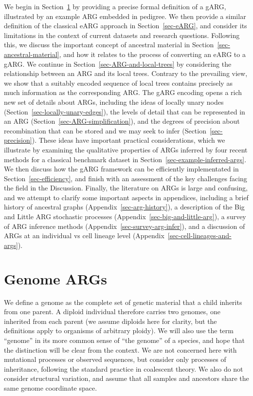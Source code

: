 \documentclass{article}
\begin{document}
We begin in Section~\ref{sec-gARG} by providing a precise formal definition
of a gARG, illustrated by an example ARG embedded in pedigree.
We then provide a similar definition of the classical eARG
approach in Section~\ref{sec-eARG}, and consider its limitations
in the context of current datasets and research questions.
Following this, we discuss the important concept of ancestral material
in Section~\ref{sec-ancestral-material}, and how it relates
to the process of converting an eARG to a gARG.
We continue
in Section~\ref{sec-ARG-and-local-trees} by considering the relationship
between an ARG and its local trees. Contrary to the
prevailing view, we show that a suitably encoded sequence of local trees contains
precisely as much information as the corresponding ARG.
The gARG encoding opens a rich new set of details about ARGs,
including the ideas of locally unary nodes
(Section~\ref{sec-locally-unary-edges}),
the levels of detail that can be represented in an ARG
(Section~\ref{sec-ARG-simplification}),
and the degrees of precision about recombination
that can be stored and we may seek to infer (Section~\ref{sec-precision}).
These ideas have important practical considerations,
which we illustrate by examining the qualitative properties of
ARGs inferred by four recent methods for a classical benchmark
dataset in Section~\ref{sec-example-inferred-args}.
We then discuss how the gARG framework can be
efficiently implementated in Section~\ref{sec-efficiency},
and finish with an assessment of the key challenges facing
the field in the Discussion.
Finally, the literature on ARGs is large and
confusing, and we attempt to clarify some important aspects
in appendices, including
a brief history of ancestral graphs (Appendix~\ref{sec-arg-history}),
a description of the Big and Little ARG stochastic processes
 (Appendix~\ref{sec-big-and-little-arg}),
a survey of ARG inference methods (Appendix~\ref{sec-survey-arg-infer}),
and a discussion of ARGs at an individual vs cell
lineage level (Appendix~\ref{sec-cell-lineages-and-args}).

\section{Genome ARGs}
\label{sec-gARG}
We define a genome as the complete set of genetic material that a child
inherits from one parent. A diploid individual
therefore carries two genomes, one inherited from each parent (we assume diploids here
for clarity, but the definitions apply to organisms of arbitrary ploidy).
We will also use the term ``genome'' in its
more common sense of ``the genome'' of a species,
and hope that the distinction will be clear from the context.
We are not concerned here with mutational processes or observed sequences,
but consider only processes of inheritance,
following the standard practice in coalescent theory.
We also do not consider structural variation, and assume that all
samples and ancestors share the same genome coordinate space.
\end{document}
